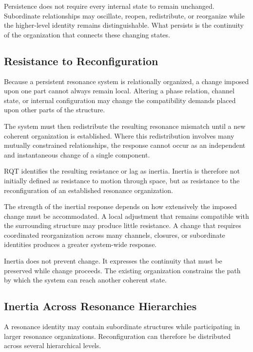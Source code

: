 \documentclass[11pt,a4paper]{article}
\begin{document}
Persistence does not require every internal state to remain unchanged. Subordinate relationships may oscillate, reopen, redistribute, or reorganize while the higher-level identity remains distinguishable. What persists is the continuity of the organization that connects these changing states.

\subsection{Resistance to Reconfiguration}

Because a persistent resonance system is relationally organized, a change imposed upon one part cannot always remain local. Altering a phase relation, channel state, or internal configuration may change the compatibility demands placed upon other parts of the structure.

The system must then redistribute the resulting resonance mismatch until a new coherent organization is established. Where this redistribution involves many mutually constrained relationships, the response cannot occur as an independent and instantaneous change of a single component.

RQT identifies the resulting resistance or lag as inertia. Inertia is therefore not initially defined as resistance to motion through space, but as resistance to the reconfiguration of an established resonance organization.

The strength of the inertial response depends on how extensively the imposed change must be accommodated. A local adjustment that remains compatible with the surrounding structure may produce little resistance. A change that requires coordinated reorganization across many channels, closures, or subordinate identities produces a greater system-wide response.

Inertia does not prevent change. It expresses the continuity that must be preserved while change proceeds. The existing organization constrains the path by which the system can reach another coherent state.

\subsection{Inertia Across Resonance Hierarchies}

A resonance identity may contain subordinate structures while participating in larger resonance organizations. Reconfiguration can therefore be distributed across several hierarchical levels.
\end{document}
